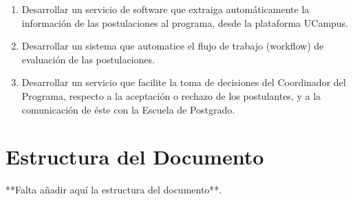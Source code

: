 \begin{intro}
	\begin{enumerate}
		\item Desarrollar un servicio de software que extraiga automáticamente
		la información de las postulaciones al programa, desde la plataforma
		UCampus.
		\item Desarrollar un sistema que automatice el flujo de trabajo
		(workflow) de evaluación de las postulaciones.
		\item Desarrollar un servicio que facilite la toma de decisiones del
		Coordinador del Programa, respecto a la aceptación o rechazo de los
		postulantes, y a la comunicación de éste con la Escuela de Postgrado.
	\end{enumerate}


	\section{Estructura del Documento}
	**Falta añadir aquí la estructura del documento**.
\end{intro}